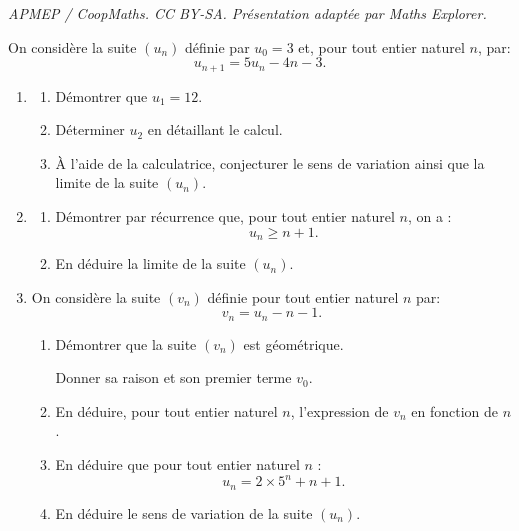 \documentclass[10pt]{article}
\begin{document}
\noindent\textit{APMEP / CoopMaths. CC BY-SA. Présentation adaptée par Maths Explorer.}\par\medskip
\medskip

On considère la suite $\left(u_n\right)$ définie par $u_0 = 3$ et, pour tout entier naturel $n$, par:
\[u_{n+1} = 5u_n - 4n - 3.\]

\smallskip

\begin{enumerate}
\item 
	\begin{enumerate}
		\item Démontrer que $u_1 = 12$.
		\item Déterminer $u_2$ en détaillant le calcul.
		\item À l'aide de la calculatrice, conjecturer le sens de variation ainsi que la limite de la suite $\left(u_n\right)$.
	\end{enumerate}
\item 
	\begin{enumerate}
		\item Démontrer par récurrence que, pour tout entier naturel $n$, on a : \[u_n\geqslant n + 1.\]
		\item En déduire la limite de la suite $\left(u_n\right)$.
	\end{enumerate}
\item On considère la suite $\left(v_n\right)$ définie pour tout entier naturel $n$ par: \[v_n = u_n - n - 1.\]
	\begin{enumerate}
		\item Démontrer que la suite $\left(v_n\right)$ est géométrique.
		
Donner sa raison et son premier terme $v_0$.
		\item En déduire, pour tout entier naturel $n$, l'expression de $v_n$ en fonction de $n$.
		\item En déduire que pour tout entier naturel $n$ :
\[u_n = 2 \times 5^n + n + 1.\]
		\item En déduire le sens de variation de la suite $\left(u_n\right)$.
	\end{enumerate}























\end{enumerate}
\end{document}
